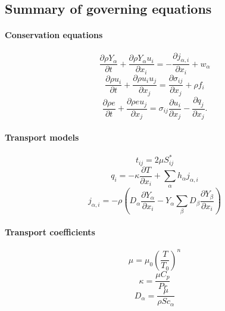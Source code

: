 \documentclass[oneside,a4paper,11pt]{report}
\begin{document}
\subsection{Summary of governing equations}
\label{sec:multi_species_eqs}

\paragraph{Conservation equations}

\begin{equation*}
    \frac{\partial\rho Y_\alpha}{\partial t}+\frac{\partial \rho Y_\alpha u_i}{\partial x_i} = -\frac{\partial j_{\alpha,i}}{\partial x_i} + w_\alpha
\end{equation*}
\begin{equation*}
    \frac{\partial \rho u_i}{\partial t} + \frac{\partial \rho u_i u_j}{\partial x_j} = \frac{\partial \sigma_{ij}}{\partial x_j} + \rho f_i
\end{equation*}
\begin{equation*}
    \frac{ \partial \rho e}{\partial t} + \frac{\partial \rho e u_j}{\partial x_j} = \sigma_{ij} \frac{\partial u_i}{\partial x_j} - \frac{\partial q_j}{\partial x_j}.
\end{equation*}

\paragraph{Transport models}

\begin{equation*}
t_{ij} = 2\mu S_{ij}^*
\end{equation*}
\begin{equation*}
q_i = -\kappa \frac{\partial T}{\partial x_i}  + \sum_\alpha h_\alpha j_{\alpha,i}
\end{equation*}
\begin{equation*}
j_{\alpha,i} = -\rho \left ( D_\alpha \frac{\partial Y_\alpha}{\partial x_i} - Y_\alpha \sum_\beta D_\beta \frac{\partial Y_\beta}{\partial x_i} \right )
\end{equation*}

\paragraph{Transport coefficients}

\begin{equation*}
\mu = \mu_0 \left ( \frac{T}{T_0} \right )^n
\end{equation*}
\begin{equation*}
\kappa = \frac{\mu C_p}{Pr}
\end{equation*}
\begin{equation*}
D_\alpha = \frac{\mu}{\rho Sc_\alpha}
\end{equation*}
\end{document}
